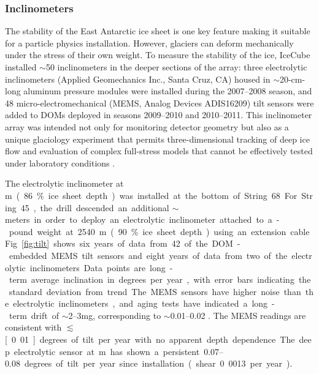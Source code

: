 \subsubsection{Inclinometers}

The stability of the East Antarctic ice sheet is one key feature making it
suitable for a particle physics installation.  However, glaciers can
deform mechanically under the stress of their own weight.  To measure the
stability of the ice, IceCube installed $\sim$50
inclinometers in the deeper sections of the array: three 
electrolytic inclinometers (Applied Geomechanics Inc., Santa Cruz, CA)
housed in $\sim$20-cm-long aluminum pressure modules were installed during
the 2007--2008 season, and 48 micro-electromechanical (MEMS, Analog Devices
ADIS16209) tilt sensors were added to DOMs deployed in seasons 2009--2010 and
2010--2011.  This inclinometer array was intended not only for monitoring
detector geometry but also as a unique glaciology experiment that
permits three-dimensional tracking of deep ice flow and evaluation of complex
full-stress models that cannot be effectively tested under laboratory
conditions \cite{pattyn03}.

The electrolytic inclinometer at \unit[2455]m (86\% ice sheet depth) was
installed at the bottom of String 68.  For String 45, the drill
descended an additional $\sim$\unit[100]meters in order to deploy an
electrolytic inclinometer attached to a \unit[100]-pound weight at 2540 m
(90\% ice sheet depth) using an extension cable.  Fig.~\ref{fig:tilt} shows
six years of data from 42 of the DOM-embedded MEMS tilt sensors and
eight years of data from two of the electrolytic inclinometers.  Data
points are long-term average inclination in degrees per year, with error
bars indicating the standard deviation from trend.  The MEMS sensors have
higher noise than the electrolytic inclinometers, and aging tests have indicated a long-term
drift of $\sim$\numrange[range-phrase = --]{2}{3}mg, corresponding to
$\sim$\numrange[range-phrase = --]{0.01}{0.02}
\cite{inclinometer_comm}. The MEMS readings are consistent with
$\lesssim$\unit[0.01]degrees of tilt per year with no apparent depth
dependence.  The deep electrolytic sensor 
at \unit[2540]m has shown a persistent \numrange[range-phrase =
  --]{0.07}{0.08} degrees of tilt per year since installation (shear 0.0013
per year).

